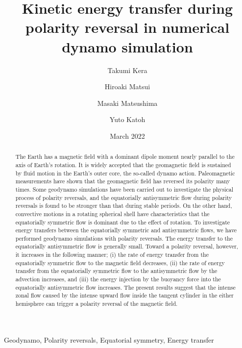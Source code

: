 \documentclass[review]{elsarticle}
\date{March 2022}
\begin{document}
\title{Kinetic energy transfer during polarity reversal in numerical dynamo simulation}

\author[Tohoku]{Takumi Kera}
\author[ucd]{Hiroaki Matsui}
\author[TITECH]{Masaki Matsushima}
\author[Tohoku]{Yuto Katoh}

\address[Tohoku]{Department of Geophysics, Tohoku University, Sendai, Japan.}
\address[ucd]{Department of the Earth and Planetary Sciences, University of California, Davis, CA, USA.}
\address[TITECH]{Department of Earth and Planetary Sciences, Institute of Science Tokyo, Tokyo, Japan.}

\begin{keyword}
Geodynamo, Polarity reversals, Equatorial symmetry, Energy transfer
\end{keyword}

\begin{abstract}
The Earth has a magnetic field with a dominant dipole moment nearly parallel to the axis of Earth’s rotation. 
{\color{teal}
It is widely accepted that the geomagnetic field is sustained by fluid motion in the Earth’s outer core, the so-called dynamo action.
}
Paleomagnetic measurements have shown that the geomagnetic field has reversed its polarity many times. 
Some geodynamo simulations have been carried out to investigate the physical process of polarity reversals, and the equatorially antisymmetric flow during polarity reversals is found to be stronger than that during stable periods. 
On the other hand, convective motions in a rotating spherical shell have characteristics that the equatorially symmetric flow is dominant due to the effect of rotation. 
{\color{teal}
To investigate energy transfers between the equatorially symmetric and antisymmetric flows, we have performed geodynamo simulations with polarity reversals.
}
The energy transfer to the equatorially antisymmetric flow is generally small.
{\color{teal}
Toward a polarity reversal, however, it increases in the following manner;
}
(i) the rate of energy transfer from the equatorially symmetric flow to the magnetic field decreases, (ii) the rate of energy transfer from the equatorially symmetric flow to the antisymmetric flow by the advection increases, and (iii) the energy injection by the buoyancy force into the equatorially antisymmetric flow increases.
The present results suggest that the intense zonal flow caused by the intense upward flow inside the tangent cylinder in the either hemisphere can trigger a polarity reversal of the magnetic field.
\end{abstract}
\end{document}
